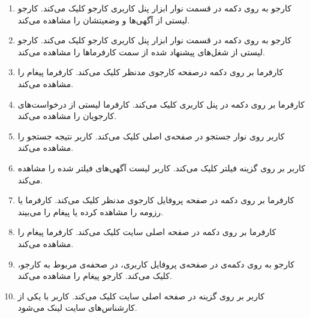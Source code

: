 \begin{enumerate}
	\item[] \label{uc:see-reqs}
	\tuc		
	{کارجو به روی دکمه‌  در قسمت نوار ابزار پنل کاربری کارجو کلیک می‌کند.}
	{کارجو لیستی از آگهی‌ها و وضعیتشان را مشاهده می‌کند.}
	
	\item[] 
	\tuc		
	{کارجو به روی دکمه‌  در قسمت نوار ابزار پنل کاربری کارجو کلیک می‌کند.}
	{کارجو لیستی از شغل‌های پیشنهاد شده از سمت کارفرماها را مشاهده می‌کند.}
		
	\item[] 
	\tuc				
	{کارفرما بر روی دکمه  درصفحه کارجوی مدنظر کلیک می‌کند.}
	{کارفرما پیغام  را مشاهده می‌کند.}
	
	\item[] \label{uc:req-manage}
	\tuc				
	{کارفرما بر روی دکمه  در پنل کاربری کلیک می‌کند.}
	{کارفرما لیستی از درخواست‌های کارجویان را مشاهده می‌کند.}
	
	\item[] \label{uc:apply-search}
	\tuc				
	{کاربر روی نوار جستجو در صفحه‌ی اصلی کلیک می‌کند.}
	{کاربر نتیجه جستجو را مشاهده می‌کند.}
	
	\item[] 
	\tuc				
	{کاربر بر روی گزینه فیلتر کلیک می‌کند.}
	{کاربر لیست آگهی‌های فیلتر شده را مشاهده می‌کند.}
	
	\item[] \label{uc:see-resumes}
	\tuc				
	{کارفرما بر روی دکمه  در صفحه پروفایل کارجوی مدنظر کلیک می‌کند.}
	{کارفرما یا رزومه را مشاهده کرده یا پیغام  را می‌بیند.}
	
	\item[] 
	\tuc				
	{کارفرما بر روی دکمه  در صفحه اصلی سایت کلیک می‌کند.}
	{کارفرما پیغام  را مشاهده می‌کند.}
	
	\item[] 
	\tuc				
	{کارجو به روی دکمه‌ی  در صفحه‌ی پروفایل کاربری، در صحفه‌ی مربوط به کارجو، کلیک می‌کند.}
	{کارجو پیغام  را مشاهده می‌کند.}
	
	\item[] 
	\tuc				
	{کاربر بر روی گزینه  در صفحه اصلی سایت کلیک می‌کند.}
	{کاربر با یکی از کارشناس‌های سایت لینک می‌شود.}
	
	\renewcommand{\labelenumi}{\arabic{enumi})}
\end{enumerate}

